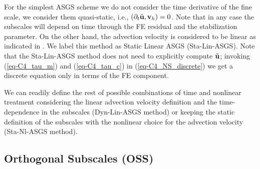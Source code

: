 For the simplest ASGS scheme we do not consider the time derivative of the fine scale, we consider them quasi-static, i.e., $(\partial_t\tilde{{\bf u}},{\bf v}_h)=0$. Note that in any case the subscales will depend on time through the FE residual and the stabilization parameter. On the other hand, the advection velocity is considered to be linear as indicated in . We label this method as Static Linear ASGS (Sta-Lin-ASGS). Note that the Sta-Lin-ASGS method does not need to explicitly compute $\tilde{{\bf u}}$; invoking (\ref{eq-C4_tau_m}) and (\ref{eq-C4_tau_c}) in (\ref{eq-C4_NS_discrete}) we get a discrete equation only in terms of the FE component.%

We can readily define the rest of possible combinations of time and nonlinear treatment considering the linear advection velocity definition and the time-dependence in the subscales (Dyn-Lin-ASGS method) or keeping the static definition of the subscales with the nonlinear choice for the advection velocity (Sta-Nl-ASGS method).

\subsection{Orthogonal Subscales (OSS)}


